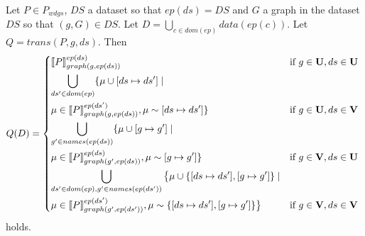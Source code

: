 \begin{lemma}\label{smalllemma}
	Let $P \in P_{wdgs}$, $DS$ a dataset so that $ep(ds) = DS$ and $G$ a graph in
	the dataset $DS$ so that $(g,G) \in DS$. 
	Let $D = \bigcup\limits_{c \in dom(ep)} data(ep(c))$.
	Let $Q = trans(P,g,ds)$.
	Then 
	\begin{align*}
		Q(D) = \begin{dcases*}
			\ll P \rr^{ep(ds)}_{graph(g,ep(ds))} 
			& if $g \in \U,ds \in \U$\\
			\bigcup\limits_{ds' \in dom(ep)} \{ \mu \cup [ds \mapsto ds'] \mid\\ \mu \in
			\ll P\rr^{ep(ds')}_{graph(g,ep(ds))}, \mu \sim 	[ds\mapsto ds'] \} 
			&if $g \in \U,ds \in \V$\\
			\bigcup\limits_{g' \in names(ep(ds))}\{ \mu \cup [g \mapsto g']
				\mid\\ \mu \in
			\ll P\rr ^{ep(ds)}_{graph(g',ep(ds))} , \mu \sim [g\mapsto g'] \} 
			& if $g \in \V,ds \in \U$ \\
			\bigcup\limits_{ds' \in dom(ep), g' \in names(ep(ds'))} \big\{ \mu \cup
				\{[ds\mapsto ds'],[g \mapsto g']\} \mid\\ \mu \in
				\ll P\rr^{ep(ds')}_{graph(g',ep(ds'))}, 
				\mu \sim
			\{[ds\mapsto ds'], [g \mapsto g']\}\big\} 
			& if $g \in \V,ds \in \V$\\
		\end{dcases*}
	\end{align*}
	holds.
\end{lemma}
